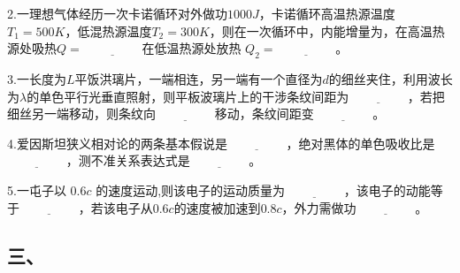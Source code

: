 2.一理想气体经历一次卡诺循环对外做功$1000J$，卡诺循环高温热源温度$T_1=500K$，低混热源温度$T_2=300K$，则在一次循环中，内能增量为，在高温热源处吸热$Q=\underline{\hspace{2cm}}$在低温热源处放热 $Q_2=\underline{\hspace{2cm}}$。

3.一长度为$L$平饭洪璃片，一端相连，另一端有一个直径为$d$的细丝夹住，利用波长为$\lambda$的单色平行光垂直照射，则平板波璃片上的干涉条纹间距为$\underline{\hspace{2cm}}$，若把细丝另一端移动，则条纹向$\underline{\hspace{2cm}}$移动，条纹间距变$\underline{\hspace{2cm}}$。

4.爱因斯坦狭义相对论的两条基本假说是$\underline{\hspace{2cm}}$，绝对黑体的单色吸收比是$\underline{\hspace{2cm}}$，测不准关系表达式是$\underline{\hspace{2cm}}$。

5.一屯子以 $0.6c$ 的速度运动,则该电子的运动质量为$\underline{\hspace{2cm}}$，该电子的动能等于$\underline{\hspace{2cm}}$，若该电子从$0.6c$的速度被加速到$0.8c$，外力需做功$\underline{\hspace{2cm}}$。
\subsection{三、}